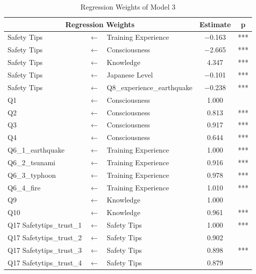 \begin{table}[h]
\caption{Regression Weights of Model 3}
\label{table21}
\centering
\begin{tabular}{|l|c|l|c|c|}
\hline
\multicolumn{3}{|c|}{Regression Weights} & Estimate & p \\
\hline
Safety Tips & $\longleftarrow$ & Training Experience & $-$0.163 & *** \\
Safety Tips & $\longleftarrow$ & Consciousness & $-$2.665 & *** \\
Safety Tips & $\longleftarrow$ & Knowledge & 4.347 & *** \\
Safety Tips & $\longleftarrow$ & Japanese Level & $-$0.101 & *** \\
Safety Tips & $\longleftarrow$ & Q8\_experience\_earthquake & $-$0.238 & *** \\
Q1 & $\longleftarrow$ & Consciousness & 1.000 & \\
Q2 & $\longleftarrow$ & Consciousness & 0.813 & *** \\
Q3 & $\longleftarrow$ & Consciousness & 0.917 & *** \\
Q4 & $\longleftarrow$ & Consciousness & 0.644 & *** \\
Q6\_1\_earthquake & $\longleftarrow$ & Training Experience & 1.000 & *** \\
Q6\_2\_tsunami & $\longleftarrow$ & Training Experience & 0.916 & *** \\
Q6\_3\_typhoon & $\longleftarrow$ & Training Experience & 0.978 & *** \\
Q6\_4\_fire & $\longleftarrow$ & Training Experience & 1.010 & *** \\
Q9 & $\longleftarrow$ & Knowledge & 1.000 & \\
Q10 & $\longleftarrow$ & Knowledge & 0.961 & *** \\
Q17 Safetytips\_trust\_1 & $\longleftarrow$ & Safety Tips & 1.000 & *** \\
Q17 Safetytips\_trust\_2 & $\longleftarrow$ & Safety Tips & 0.902 & \\
Q17 Safetytips\_trust\_3 & $\longleftarrow$ & Safety Tips & 0.898 & *** \\
Q17 Safetytips\_trust\_4 & $\longleftarrow$ & Safety Tips & 0.879 & \\
\hline
\end{tabular}
\end{table}

